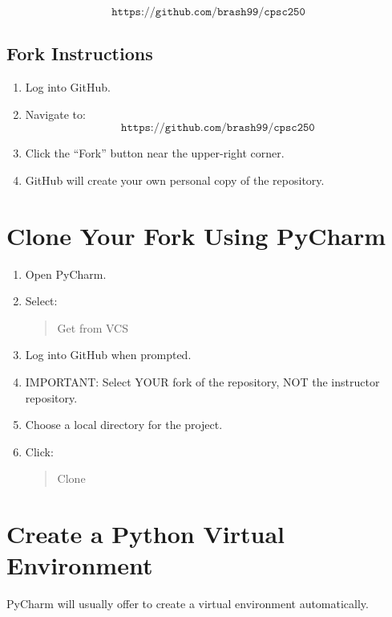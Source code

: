 \documentclass[11pt]{article}
\begin{document}
\[
\texttt{https://github.com/brash99/cpsc250}
\]

\subsection{Fork Instructions}

\begin{enumerate}
    \item Log into GitHub.

    \item Navigate to:
    \[
    \texttt{https://github.com/brash99/cpsc250}
    \]

    \item Click the ``Fork'' button near the upper-right corner.

    \item GitHub will create your own personal copy of the repository.
\end{enumerate}

\section{Clone Your Fork Using PyCharm}

\begin{enumerate}
    \item Open PyCharm.

    \item Select:
    \begin{quote}
    Get from VCS
    \end{quote}

    \item Log into GitHub when prompted.

    \item IMPORTANT:
    Select YOUR fork of the repository, NOT the instructor repository.

    \item Choose a local directory for the project.

    \item Click:
    \begin{quote}
    Clone
    \end{quote}
\end{enumerate}

\section{Create a Python Virtual Environment}

PyCharm will usually offer to create a virtual environment automatically.
\end{document}

